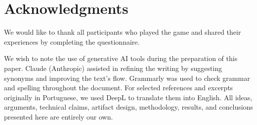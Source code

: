 \section*{Acknowledgments}

We would like to thank all participants who played the game and shared their experiences by completing the questionnaire.

We wish to note the use of generative AI tools during the preparation of this paper. Claude (Anthropic) assisted in refining the writing by suggesting synonyms and improving the text's flow. Grammarly was used to check grammar and spelling throughout the document. For selected references and excerpts originally in Portuguese, we used DeepL to translate them into English. All ideas, arguments, technical claims, artifact design, methodology, results, and conclusions presented here are entirely our own.
